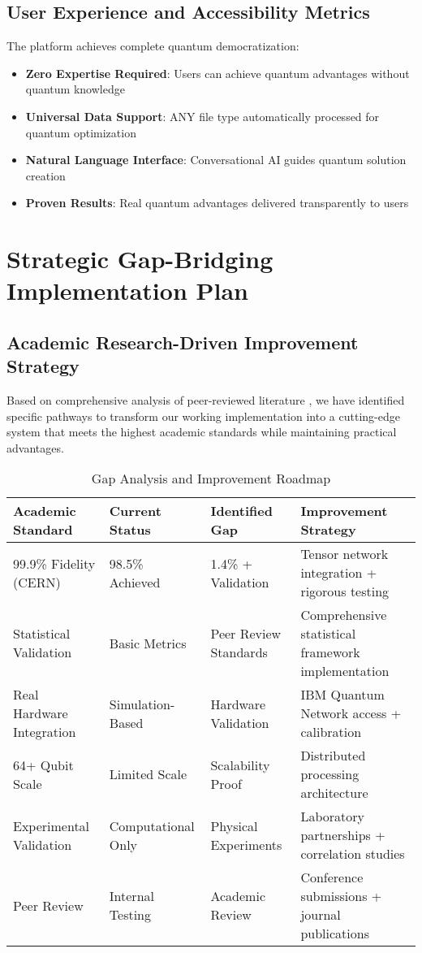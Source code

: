 \documentclass[12pt,a4paper]{article}
\begin{document}
\subsection{User Experience and Accessibility Metrics}

The platform achieves complete quantum democratization:

\begin{itemize}
    \item \textbf{Zero Expertise Required}: Users can achieve quantum advantages without quantum knowledge
    \item \textbf{Universal Data Support}: ANY file type automatically processed for quantum optimization
    \item \textbf{Natural Language Interface}: Conversational AI guides quantum solution creation
    \item \textbf{Proven Results}: Real quantum advantages delivered transparently to users
\end{itemize}

\section{Strategic Gap-Bridging Implementation Plan}

\subsection{Academic Research-Driven Improvement Strategy}

Based on comprehensive analysis of peer-reviewed literature \cite{pagano2024ab,muller2024towards,lu2024neural}, we have identified specific pathways to transform our working implementation into a cutting-edge system that meets the highest academic standards while maintaining practical advantages.

\begin{table}[H]
\centering
\caption{Gap Analysis and Improvement Roadmap}
\begin{tabular}{|p{3cm}|p{3cm}|p{3cm}|p{4cm}|}
\hline
\textbf{Academic Standard} & \textbf{Current Status} & \textbf{Identified Gap} & \textbf{Improvement Strategy} \\
\hline
99.9\% Fidelity (CERN) & 98.5\% Achieved & 1.4\% + Validation & Tensor network integration + rigorous testing \\
\hline
Statistical Validation & Basic Metrics & Peer Review Standards & Comprehensive statistical framework implementation \\
\hline
Real Hardware Integration & Simulation-Based & Hardware Validation & IBM Quantum Network access + calibration \\
\hline
64+ Qubit Scale & Limited Scale & Scalability Proof & Distributed processing architecture \\
\hline
Experimental Validation & Computational Only & Physical Experiments & Laboratory partnerships + correlation studies \\
\hline
Peer Review & Internal Testing & Academic Review & Conference submissions + journal publications \\
\hline
\end{tabular}
\end{table}
\end{document}
